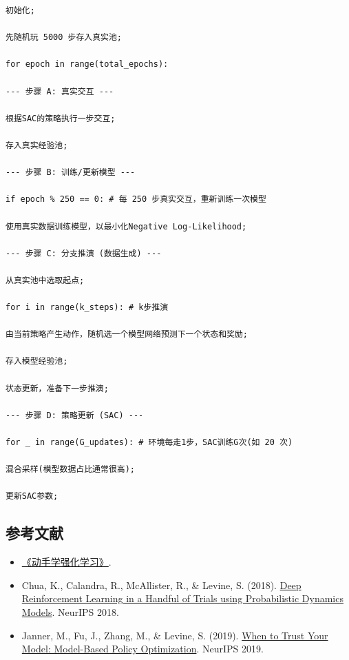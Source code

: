 \begin{verbatim}
初始化;

先随机玩 5000 步存入真实池;

for epoch in range(total_epochs):

--- 步骤 A: 真实交互 ---

根据SAC的策略执行一步交互;

存入真实经验池;

--- 步骤 B: 训练/更新模型 ---

if epoch % 250 == 0: # 每 250 步真实交互，重新训练一次模型

使用真实数据训练模型，以最小化Negative Log-Likelihood;

--- 步骤 C: 分支推演 (数据生成) ---

从真实池中选取起点;

for i in range(k_steps): # k步推演

由当前策略产生动作，随机选一个模型网络预测下一个状态和奖励;

存入模型经验池;

状态更新，准备下一步推演;

--- 步骤 D: 策略更新 (SAC) ---

for _ in range(G_updates): # 环境每走1步，SAC训练G次(如 20 次)

混合采样(模型数据占比通常很高);

更新SAC参数;
\end{verbatim}

\FloatBarrier
{}
\hypertarget{ux53c2ux8003ux6587ux732e-63}{%
\subsection{参考文献}\label{ux53c2ux8003ux6587ux732e-63}}

\vspace{0.25em}
\begin{itemize}
\tightlist
\item
  \href{https://hrl.boyuai.com/}{《动手学强化学习》}.
\item
  Chua, K., Calandra, R., McAllister, R., \& Levine, S. (2018). \href{https://arxiv.org/abs/1805.12114}{Deep Reinforcement Learning in a Handful of Trials using Probabilistic Dynamics Models}. NeurIPS 2018.
\item
  Janner, M., Fu, J., Zhang, M., \& Levine, S. (2019). \href{https://arxiv.org/abs/1906.08253}{When to Trust Your Model: Model-Based Policy Optimization}. NeurIPS 2019.
\end{itemize}

\clearpage
